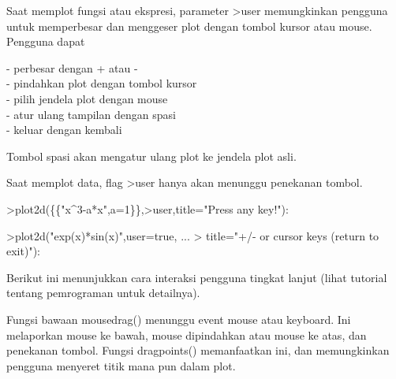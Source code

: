 \documentclass{article}
\begin{document}
\begin{eulernotebook}
\begin{eulercomment}
\begin{eulercomment}
\begin{eulercomment}
\begin{eulercomment}
\begin{eulercomment}
\begin{eulercomment}
\begin{eulercomment}
\begin{eulercomment}
\begin{eulercomment}
\begin{eulercomment}
\begin{eulercomment}
\begin{eulercomment}
\begin{eulercomment}
\begin{eulercomment}
\begin{eulercomment}
\begin{eulercomment}
\eulersubheading{}
\begin{eulercomment}
\end{eulercomment}
\begin{eulercomment}
Saat memplot fungsi atau ekspresi, parameter \textgreater{}user memungkinkan
pengguna untuk memperbesar dan menggeser plot dengan tombol kursor
atau mouse. Pengguna dapat

- perbesar dengan + atau -\\
- pindahkan plot dengan tombol kursor\\
- pilih jendela plot dengan mouse\\
- atur ulang tampilan dengan spasi\\
- keluar dengan kembali

Tombol spasi akan mengatur ulang plot ke jendela plot asli.

Saat memplot data, flag \textgreater{}user hanya akan menunggu penekanan tombol.
\end{eulercomment}
\begin{eulerprompt}
>plot2d(\{\{"x^3-a*x",a=1\}\},>user,title="Press any key!"):
\end{eulerprompt}
\begin{eulerprompt}
>plot2d("exp(x)*sin(x)",user=true, ...
>  title="+/- or cursor keys (return to exit)"):
\end{eulerprompt}
\begin{eulercomment}
Berikut ini menunjukkan cara interaksi pengguna tingkat lanjut (lihat
tutorial tentang pemrograman untuk detailnya).

Fungsi bawaan mousedrag() menunggu event mouse atau keyboard. Ini
melaporkan mouse ke bawah, mouse dipindahkan atau mouse ke atas, dan
penekanan tombol. Fungsi dragpoints() memanfaatkan ini, dan
memungkinkan pengguna menyeret titik mana pun dalam plot.


\end{eulercomment}
\end{eulercomment}
\end{eulercomment}
\end{eulercomment}
\end{eulercomment}
\end{eulercomment}
\end{eulercomment}
\end{eulercomment}
\end{eulercomment}
\end{eulercomment}
\end{eulercomment}
\end{eulercomment}
\end{eulercomment}
\end{eulercomment}
\end{eulercomment}
\end{eulercomment}
\end{eulercomment}
\end{eulernotebook}
\end{document}
